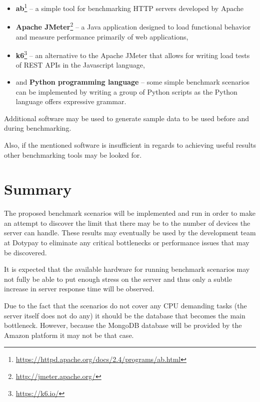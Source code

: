 \documentclass[12pt, a4paper]{article}
\let\oldsection\section
\renewcommand\section{\clearpage\oldsection}
\begin{document}
\begin{itemize}
    \item \textbf{ab}\footnote{\url{https://httpd.apache.org/docs/2.4/programs/ab.html}}  -- a simple tool for benchmarking HTTP servers developed by Apache
   \item \textbf{Apache JMeter}\footnote{\url{http://jmeter.apache.org/}} -- a Java application designed to load functional behavior and measure performance primarily of web applications,
   \item \textbf{k6}\footnote{\url{https://k6.io/}} -- an alternative to the Apache JMeter that allows for writing load tests of REST APIs in the Javascript language,
   \item and \textbf{Python programming language} -- some simple benchmark scenarios can be implemented by writing a group of Python scripts as the Python language offers expressive grammar.
\end{itemize}

Additional software may be used to generate sample data to be used before and during benchmarking.

Also, if the mentioned software is insufficient in regards to achieving useful results other benchmarking tools may be looked for.

\section{Summary}
The proposed benchmark scenarios will be implemented and run in order to make an attempt to discover the limit that there may be to the number of devices the server can handle. 
These results may eventually be used by the development team at Dotypay to eliminate any critical bottlenecks or performance issues that may be discovered.

It is expected that the available hardware for running benchmark scenarios may not fully be able to put enough stress on the server and thus only a subtle increase in server response time will be observed.

Due to the fact that the scenarios do not cover any CPU demanding tasks (the server itself does not do any) it should be the database that becomes the main bottleneck. However, because the MongoDB database will be provided by the Amazon platform it may not be that case.
\end{document}
